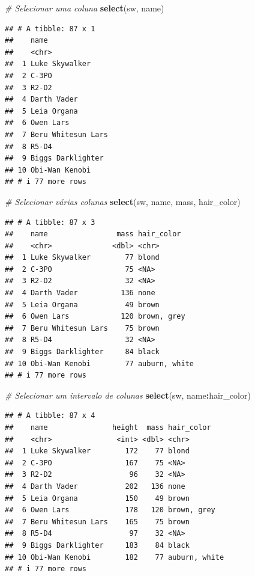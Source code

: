 \documentclass[
]{book}
\newenvironment{Shaded}{\begin{snugshade}}{\end{snugshade}}
\newcommand{\CommentTok}[1]{\textcolor[rgb]{0.56,0.35,0.01}{\textit{#1}}}
\newcommand{\FunctionTok}[1]{\textcolor[rgb]{0.13,0.29,0.53}{\textbf{#1}}}
\newcommand{\NormalTok}[1]{#1}
\newcommand{\SpecialCharTok}[1]{\textcolor[rgb]{0.81,0.36,0.00}{\textbf{#1}}}
\begin{document}
\begin{Shaded}
\begin{Highlighting}[]
\CommentTok{\# Selecionar uma coluna}
\FunctionTok{select}\NormalTok{(sw, name)}
\end{Highlighting}
\end{Shaded}

\begin{verbatim}
## # A tibble: 87 x 1
##    name              
##    <chr>             
##  1 Luke Skywalker    
##  2 C-3PO             
##  3 R2-D2             
##  4 Darth Vader       
##  5 Leia Organa       
##  6 Owen Lars         
##  7 Beru Whitesun Lars
##  8 R5-D4             
##  9 Biggs Darklighter 
## 10 Obi-Wan Kenobi    
## # i 77 more rows
\end{verbatim}

\begin{Shaded}
\begin{Highlighting}[]
\CommentTok{\# Selecionar várias colunas}
\FunctionTok{select}\NormalTok{(sw, name, mass, hair\_color)}
\end{Highlighting}
\end{Shaded}

\begin{verbatim}
## # A tibble: 87 x 3
##    name                mass hair_color   
##    <chr>              <dbl> <chr>        
##  1 Luke Skywalker        77 blond        
##  2 C-3PO                 75 <NA>         
##  3 R2-D2                 32 <NA>         
##  4 Darth Vader          136 none         
##  5 Leia Organa           49 brown        
##  6 Owen Lars            120 brown, grey  
##  7 Beru Whitesun Lars    75 brown        
##  8 R5-D4                 32 <NA>         
##  9 Biggs Darklighter     84 black        
## 10 Obi-Wan Kenobi        77 auburn, white
## # i 77 more rows
\end{verbatim}

\begin{Shaded}
\begin{Highlighting}[]
\CommentTok{\# Selecionar um intervalo de colunas}
\FunctionTok{select}\NormalTok{(sw, name}\SpecialCharTok{:}\NormalTok{hair\_color)}
\end{Highlighting}
\end{Shaded}

\begin{verbatim}
## # A tibble: 87 x 4
##    name               height  mass hair_color   
##    <chr>               <int> <dbl> <chr>        
##  1 Luke Skywalker        172    77 blond        
##  2 C-3PO                 167    75 <NA>         
##  3 R2-D2                  96    32 <NA>         
##  4 Darth Vader           202   136 none         
##  5 Leia Organa           150    49 brown        
##  6 Owen Lars             178   120 brown, grey  
##  7 Beru Whitesun Lars    165    75 brown        
##  8 R5-D4                  97    32 <NA>         
##  9 Biggs Darklighter     183    84 black        
## 10 Obi-Wan Kenobi        182    77 auburn, white
## # i 77 more rows
\end{verbatim}
\end{document}
